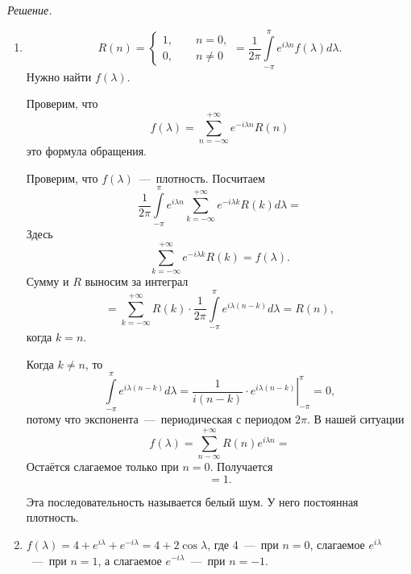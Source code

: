 \textit{Решение.}
\begin{enumerate}[label=\alph*)]
  \item
  \begin{equation*}
    R \left( n \right) =
    \begin{cases}
      1, \qquad n = 0, \\
      0, \qquad n \neq 0
    \end{cases} =
    \frac{1}{2 \pi }
    \int \limits_{-\pi }^{ \pi } e^{i \lambda n} f \left( \lambda \right) d \lambda.
  \end{equation*}
  Нужно найти $f \left( \lambda \right) $.

  Проверим, что
  \begin{equation*}
    f \left( \lambda \right) =
    \sum \limits_{n = -\infty }^{+\infty } e^{-i \lambda n} R \left( n \right)
  \end{equation*}
  это формула обращения.

  Проверим, что $f \left( \lambda \right) $~---~плотность.
  Посчитаем
  \begin{equation*}
    \frac{1}{2 \pi }
    \int \limits_{-\pi }^{ \pi }
      e^{i \lambda n} \sum \limits_{k = -\infty }^{+\infty } e^{-i \lambda k} R \left( k \right)
    d \lambda =
  \end{equation*}
  Здесь
  \begin{equation*}
    \sum \limits_{k = -\infty }^{+\infty } e^{-i \lambda k} R \left( k \right) =
    f \left( \lambda \right).
  \end{equation*}
  Сумму и $R$ выносим за интеграл
  \begin{equation*}
    = \sum \limits_{k = -\infty }^{+\infty }
      R \left( k \right) \cdot \frac{1}{2 \pi }
      \int \limits_{-\pi }^{ \pi } e^{i \lambda \left( n - k \right) } d \lambda =
    R \left( n \right),
  \end{equation*}
  когда $k = n$.

  Когда $k \neq n$, то
  \begin{equation*}
    \int \limits_{-\pi }^{ \pi } e^{i \lambda \left( n - k \right) } d \lambda =
    \left.
      \frac{1}{i \left( n - k \right) } \cdot e^{i \lambda \left( n - k \right) }
    \right|_{-\pi }^{ \pi } =
    0,
  \end{equation*}
  потому что экспонента~---~периодическая с периодом $2 \pi $.
  В нашей ситуации
  \begin{equation*}
    f \left( \lambda \right) =
    \sum \limits_{n - \infty }^{+\infty } R \left( n \right) e^{i \lambda n} =
  \end{equation*}
  Остаётся слагаемое только при $n = 0$.
  Получается
  \begin{equation*}
    = 1.
  \end{equation*}

  Эта последовательность называется белый шум.
  У него постоянная плотность.
  \item $f \left( \lambda \right) =
    4 + e^{i \lambda } + e^{-i \lambda } =
    4 + 2 \cos \lambda $,
  где 4~---~при $n = 0$, слагаемое $e^{i \lambda }$~---~при $n = 1$,
  а слагаемое $e^{-i \lambda }$~---~при $n = -1$.
\end{enumerate}

